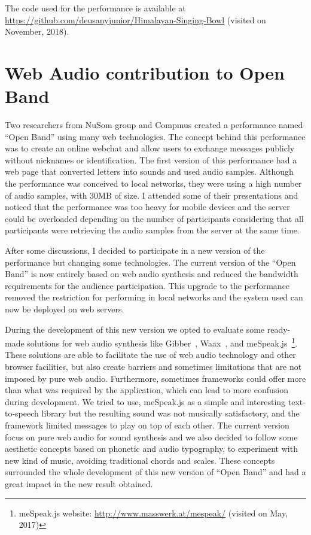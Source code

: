 The code used for the performance is available at\\ \url{https://github.com/deusanyjunior/Himalayan-Singing-Bowl} (visited on November, 2018).

\section{Web Audio contribution to Open Band}
\label{apesec:appbandaaberta}

Two researchers from NuSom group and Compmus created a performance named ``Open Band'' using many web technologies.
The concept behind this performance was to create an online webchat and allow users to exchange messages publicly without nicknames or identification.
The first version of this performance had a web page that converted letters into sounds and used audio samples.
Although the performance was conceived to local networks, they were using a high number of audio samples, with 30MB of size.
I attended some of their presentations and noticed that the performance was too heavy for mobile devices and the server could be overloaded depending on the number of participants considering that all participants were retrieving the audio samples from the server at the same time.

After some discussions, I decided to participate in a new version of the performance but changing some technologies.
The current version of the ``Open Band'' is now entirely based on web audio synthesis and reduced the bandwidth requirements for the audience participation.
This upgrade to the performance removed the restriction for performing in local networks and the system used can now be deployed on web servers.

During the development of this new version we opted to evaluate some ready-made solutions for web audio synthesis like Gibber~\citep{Roberts2012gibberlivecoding}, Waax~\citep{Choi2013waax}, and meSpeak.js~\footnote{meSpeak.js website: \url{http://www.masswerk.at/mespeak/} (visited on May, 2017)}.
These solutions are able to facilitate the use of web audio technology and other browser facilities, but also create barriers and sometimes limitations that are not imposed by pure web audio.
Furthermore, sometimes frameworks could offer more than what was required by the application, which can lead to more confusion during development. 
We tried to use, meSpeak.js as a simple and interesting text-to-speech library but the resulting sound was not musically satisfactory, and the framework limited messages to play on top of each other.
The current version focus on pure web audio for sound synthesis and we also decided to follow some aesthetic concepts based on phonetic and audio typography, to experiment with new kind of music, avoiding traditional chords and scales. 
These concepts surrounded the whole development of this new version of ``Open Band'' and had a great impact in the new result obtained.

